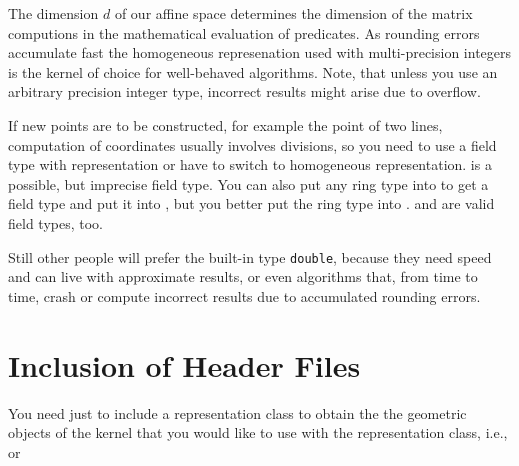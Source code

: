 The dimension $d$ of our affine space determines the dimension of the
matrix computions in the mathematical evaluation of predicates.  As
rounding errors accumulate fast the homogeneous represenation used
with multi-precision integers is the kernel of choice for well-behaved
algorithms.  Note, that unless you use an arbitrary precision integer
type, incorrect results might arise due to overflow.

If new points are to be constructed, for example the
 point of two lines, computation of
 coordinates usually involves divisions,
so you need to use a field type with 
representation or have to switch to homogeneous representation.
 is a possible, but imprecise field type.  You can also
put any ring type into  to get a field type and put it
into , but you better put the ring type into
.   and  are valid
field types, too.

Still other people will prefer the built-in type {\tt double}, because
they need speed and can live with approximate results, or even
algorithms that, from time to time, crash or compute incorrect results
due to accumulated rounding errors.

\section{Inclusion of Header Files}

You need just to include a representation class to obtain the the
geometric objects of the kernel that you would like to use with the
representation class, i.e.,  or



